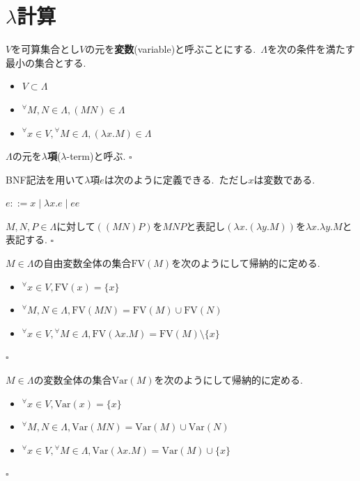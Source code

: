 \section{$\lambda$計算}

\begin{definition}
$V$を可算集合とし$V$の元を\textbf{変数}(variable)と呼ぶことにする.\ $\Lambda$を次の条件を満たす最小の集合とする.
\begin{itemize}
    \item $V \subset \Lambda$
    \item ${^{\forall}}M, N \in \Lambda, (M N) \in \Lambda$
    \item ${^{\forall}}x \in V, {^{\forall}}M \in \Lambda, (\lambda x.M) \in \Lambda$
\end{itemize}
$\Lambda$の元を\textbf{$\lambda$項}($\lambda$-term)と呼ぶ.
\hfill $\square$
\end{definition}

BNF記法を用いて$\lambda$項$e$は次のように定義できる.\ ただし$x$は変数である.
\begin{center}
$e ::= x \mid \lambda x. e \mid e e$
\end{center}

\begin{remark}
$M,N,P \in \Lambda$に対して$((M N) P)$を$M N P$と表記し$(\lambda x.(\lambda y.M))$を$\lambda x. \lambda y.M$と表記する.
\hfill $\square$
\end{remark}

\begin{definition}
$M \in \Lambda$の自由変数全体の集合$\textrm{FV}(M)$を次のようにして帰納的に定める.
\begin{itemize}
    \item ${^{\forall}}x \in V, \textrm{FV}(x) = \{x\}$
    \item ${^{\forall}}M, N \in \Lambda, \textrm{FV}(M N) = \textrm{FV}(M) \cup \textrm{FV}(N)$
    \item ${^{\forall}}x \in V, {^{\forall}}M \in \Lambda, \textrm{FV}(\lambda x.M) = \textrm{FV}(M) \setminus \{x\}$
\end{itemize}
\hfill $\square$
\end{definition}

\begin{definition}
$M \in \Lambda$の変数全体の集合$\textrm{Var}(M)$を次のようにして帰納的に定める.
\begin{itemize}
    \item ${^{\forall}}x \in V, \textrm{Var}(x) = \{x\}$
    \item ${^{\forall}}M, N \in \Lambda, \textrm{Var}(M N) = \textrm{Var}(M) \cup \textrm{Var}(N)$
    \item ${^{\forall}}x \in V, {^{\forall}}M \in \Lambda, \textrm{Var}(\lambda x.M) = \textrm{Var}(M) \cup \{x\}$
\end{itemize}
\hfill $\square$
\end{definition}

